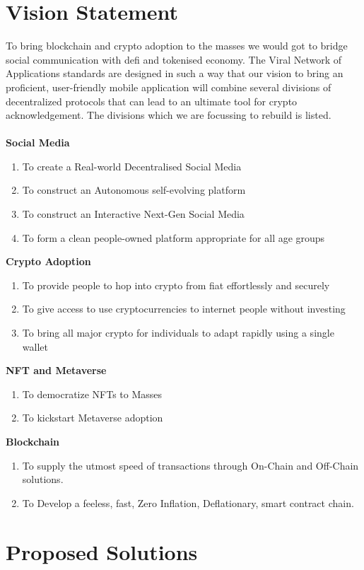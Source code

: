 \documentclass[10pt]{article}
\begin{document}
\section{Vision Statement}
To bring blockchain and crypto adoption to the masses we would got to bridge social communication with defi and tokenised economy. The Viral Network of Applications standards are designed in such a way that our vision to bring an proficient, user-friendly mobile application will combine several divisions of decentralized protocols that can lead to an ultimate tool for crypto acknowledgement. The divisions which we are focussing to rebuild is listed.\\
\\
\textbf{\large Social Media}
\begin{enumerate}
\item To create a Real-world Decentralised Social Media
\item To construct an Autonomous self-evolving platform
\item To construct an Interactive Next-Gen Social Media
\item To form a clean people-owned platform appropriate for all age groups
\end{enumerate}
\textbf{\large Crypto Adoption}
\begin{enumerate}
\item To provide people to hop into crypto from fiat effortlessly and securely
\item To give access to use cryptocurrencies to internet people without investing
\item To bring all major crypto for individuals to adapt rapidly using a single wallet
\end{enumerate}
\textbf{\large NFT and Metaverse}
\begin{enumerate}
\item To democratize NFTs to Masses
\item To kickstart Metaverse adoption
\end{enumerate}
\textbf{\large Blockchain}
\begin{enumerate}
\item To supply the utmost speed of transactions through On-Chain and Off-Chain solutions.
\item To Develop a feeless, fast, Zero Inflation, Deflationary, smart contract chain.
\end{enumerate}

\section{Proposed Solutions}
\end{document}
